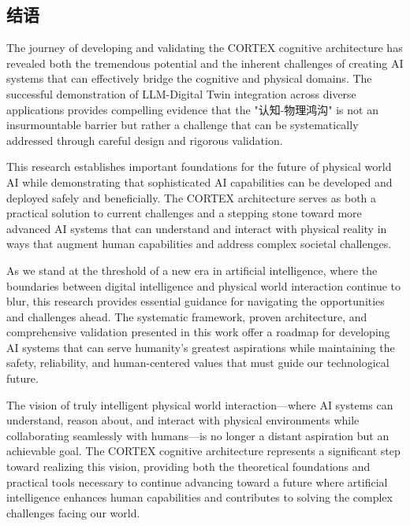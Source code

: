 \subsection{结语}

The journey of developing and validating the CORTEX cognitive architecture has revealed both the tremendous potential and the inherent challenges of creating AI systems that can effectively bridge the cognitive and physical domains. The successful demonstration of LLM-Digital Twin integration across diverse applications provides compelling evidence that the "认知-物理鸿沟" is not an insurmountable barrier but rather a challenge that can be systematically addressed through careful design and rigorous validation.

This research establishes important foundations for the future of physical world AI while demonstrating that sophisticated AI capabilities can be developed and deployed safely and beneficially. The CORTEX architecture serves as both a practical solution to current challenges and a stepping stone toward more advanced AI systems that can understand and interact with physical reality in ways that augment human capabilities and address complex societal challenges.

As we stand at the threshold of a new era in artificial intelligence, where the boundaries between digital intelligence and physical world interaction continue to blur, this research provides essential guidance for navigating the opportunities and challenges ahead. The systematic framework, proven architecture, and comprehensive validation presented in this work offer a roadmap for developing AI systems that can serve humanity's greatest aspirations while maintaining the safety, reliability, and human-centered values that must guide our technological future.

The vision of truly intelligent physical world interaction—where AI systems can understand, reason about, and interact with physical environments while collaborating seamlessly with humans—is no longer a distant aspiration but an achievable goal. The CORTEX cognitive architecture represents a significant step toward realizing this vision, providing both the theoretical foundations and practical tools necessary to continue advancing toward a future where artificial intelligence enhances human capabilities and contributes to solving the complex challenges facing our world.

